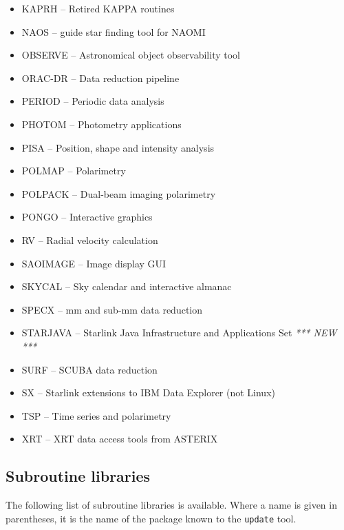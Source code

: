 \documentclass[twoside,11pt]{article}
\newcommand{\xlabel}[1]{}
\renewcommand{\_}{\texttt{\symbol{95}}}
\begin{document}
\begin{itemize}
\item KAPRH -- Retired KAPPA routines
\item NAOS -- guide star finding tool for NAOMI
\item OBSERVE -- Astronomical object observability tool
\item ORAC-DR -- Data reduction pipeline
\item PERIOD -- Periodic data analysis
\item PHOTOM -- Photometry applications
\item PISA -- Position, shape and intensity analysis
\item POLMAP -- Polarimetry
\item POLPACK -- Dual-beam imaging polarimetry
\item PONGO -- Interactive graphics
\item RV -- Radial velocity calculation
\item SAOIMAGE -- Image display GUI
\item SKYCAL -- Sky calendar and interactive almanac
\item SPECX -- mm and sub-mm data reduction
\item STARJAVA -- Starlink Java Infrastructure and Applications Set \hfill \emph{*** NEW ***}
\item SURF -- SCUBA data reduction
\item SX -- Starlink extensions to IBM Data Explorer (not Linux)
\item TSP -- Time series and polarimetry
\item XRT -- XRT data access tools from ASTERIX
\end{itemize}

\subsection{\xlabel{subroutine_libraries}Subroutine libraries}
\label{subroutine_libraries}

The following list of subroutine libraries is available.  Where a name
is given in parentheses, it is the name of the package known to the
\texttt{update} tool.
\end{document}
